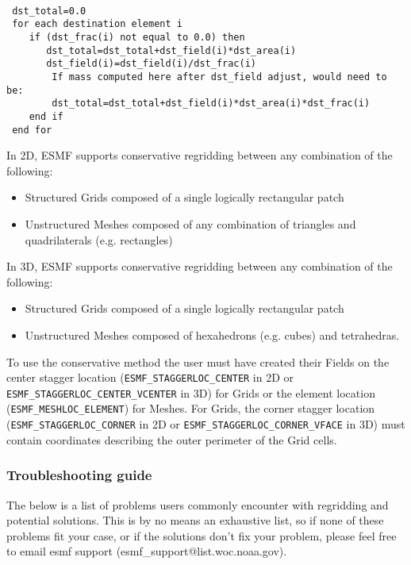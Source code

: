 \begin{verbatim}

 dst_total=0.0
 for each destination element i
    if (dst_frac(i) not equal to 0.0) then
       dst_total=dst_total+dst_field(i)*dst_area(i) 
       dst_field(i)=dst_field(i)/dst_frac(i)
        If mass computed here after dst_field adjust, would need to be:
        dst_total=dst_total+dst_field(i)*dst_area(i)*dst_frac(i) 
    end if
 end for
\end{verbatim}

\smallskip

 In 2D, ESMF supports conservative regridding between any combination of the following:
 \begin{itemize}
 \item Structured Grids composed of a single logically rectangular patch
 \item Unstructured Meshes composed of any combination of triangles and quadrilaterals (e.g. rectangles)
 \end{itemize}

\smallskip

 In 3D, ESMF supports conservative regridding between any combination of the following:
 \begin{itemize}
 \item Structured Grids composed of a single logically rectangular patch
 \item Unstructured Meshes composed of hexahedrons (e.g. cubes) and tetrahedras.
 \end{itemize}

\smallskip

 To use the conservative method the user must have created their Fields on the center 
 stagger location ({\tt ESMF\_STAGGERLOC\_CENTER} in 2D or {\tt ESMF\_STAGGERLOC\_CENTER\_VCENTER} in 3D) for Grids  or the element location ({\tt ESMF\_MESHLOC\_ELEMENT}) for Meshes.
 For Grids, the corner stagger location ({\tt ESMF\_STAGGERLOC\_CORNER} in 2D or {\tt ESMF\_STAGGERLOC\_CORNER\_VFACE} in 3D) must contain coordinates describing the outer perimeter of the Grid cells. 

\subsubsection{Troubleshooting guide}

 The below is a list of problems users commonly encounter with regridding and potential solutions. 
 This is by no means an exhaustive list, so if none of these problems fit your case, or if the solutions
 don't fix your problem, please feel free to email esmf support (esmf\_support@list.woc.noaa.gov).

